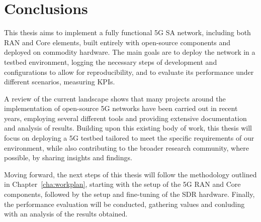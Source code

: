 
%

\chapter{Conclusions}
\label{cha:conclusions}

This thesis aims to implement a fully functional 5G \gls{SA} network, including both \gls{RAN} and Core elements, built entirely with open-source components and deployed on commodity hardware. The main goals are to deploy the network in a testbed environment, logging the necessary steps of development and configurations to allow for reproducibility, and to evaluate its performance under different scenarios, measuring \glspl{KPI}. 

A review of the current landscape shows that many projects around the implementation of open-source 5G networks have been carried out in recent years, employing several different tools and providing extensive documentation and analysis of results. Building upon this existing body of work, this thesis will focus on deploying a 5G testbed tailored to meet the specific requirements of our environment, while also contributing to the broader research community, where possible, by sharing insights and findings.

Moving forward, the next steps of this thesis will follow the methodology outlined in Chapter~\ref{cha:workplan}, starting with the setup of the 5G \gls{RAN} and Core components, followed by the setup and fine-tuning of the \gls{SDR} hardware. Finally, the performance evaluation will be conducted, gathering  values and conluding with an analysis of the results obtained.
